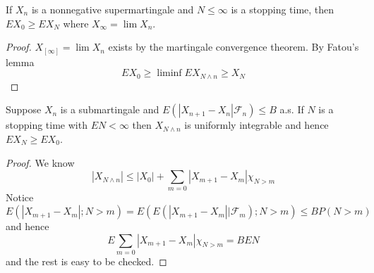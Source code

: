 \documentclass[lang=en, color=blue, ]{elegantbook}
\newcommand{\F}{\mathcal{F}}
\begin{document}
\begin{theorem}
    If $X_n$ is a nonnegative supermartingale and $N\leq \infty$ is a stopping time, then $EX_0 \geq EX_N$ where $X_{\infty} = \lim X_n$.
\end{theorem}
\begin{proof}
    $X_[\infty] = \lim X_n$ exists by the martingale convergence theorem. By Fatou's lemma
    \[
    EX_0 \geq \liminf EX_{N\wedge n} \geq X_N
    \]
\end{proof}

\begin{theorem}
    Suppose $X_n$ is a submartingale and $E(|X_{n+1}-X_n|\F_n) \leq B$ a.s. If $N$ is a stopping time with $EN < \infty$ then $X_{N\wedge n}$ is uniformly integrable and hence $EX_N \geq EX_0$.
\end{theorem}
\begin{proof}
    We know
    \[|X_{N\wedge n}| \leq |X_0| + \sum\limits_{m=0}|X_{m+1}-X_m|\chi_{N>m}\]
    Notice
    \[
    E(|X_{m+1}-X_m|;N>m) = E(E(|X_{m+1}-X_m||\F_m); N > m) \leq BP(N>m)
    \]
    and hence
    \[
    E\sum\limits_{m=0}|X_{m+1}-X_m|\chi_{N>m} = BEN
    \]
    and the rest is easy to be checked.
\end{proof}
\end{document}
